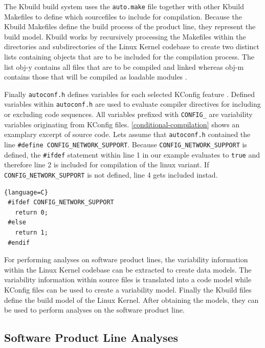 \documentclass[a4paper]{article}
\begin{document}
The Kbuild build system uses the \texttt{auto.make} file together with other Kbuild Makefiles to define which sourcefiles to include for compilation. Because the Kbuild Makefiles define the build process of the product line, they represent the build model. Kbuild works by recursively processing the Makefiles within the directories and subdirectories of the Linux Kernel codebase to create two distinct lists containing objects that are to be included for the compilation process. The list obj-y contains all files that are to be compiled and linked whereas  obj-m contains those that will be compiled as loadable modules \cite{nadi-linux-kernel}\cite{makefiles.txt}. 

Finally \texttt{autoconf.h} defines variables for each selected KConfig feature \cite{Tartler:2011:FCC:1966445.1966451}. Defined variables within \texttt{autoconf.h} are used to evaluate compiler directives for including or excluding code sequences. All variables prefixed with \texttt{CONFIG\_} are variability variables originating from KConfig files. \autoref{conditional-compilation} shows an examplary excerpt of source code. Lets assume that \texttt{autoconf.h} contained the line \texttt{\#define CONFIG\_\-NETWORK\_\-SUPPORT}. Because \texttt{CONFIG\_\-NETWORK\_\-SUPPORT} is defined, the \texttt{\#ifdef} statement within line 1 in our example evaluates to \texttt{true} and therefore line 2 is included for compilation of the  linux variant. If \texttt{CONFIG\_\-NETWORK\_\-SUPPORT} is not defined, line 4 gets included instad.

\begin{lstlisting}[caption=Conditional Compilation within the Linux Kernel, label=conditional-compilation]{language=C}
 #ifdef CONFIG_NETWORK_SUPPORT
   return 0;
 #else 
   return 1;
 #endif
\end{lstlisting}

For performing analyses on software product lines, the variability information within the Linux Kernel codebase can be extracted to create data models. The variability information within source files is translated into a code model while KConfig files can be used to create a variability model. Finally the Kbuild files define the build model of the Linux Kernel. After obtaining the models, they can be used to perform analyses on the software product line.

\subsection{Software Product Line Analyses} \label{software-analyses}
\end{document}

